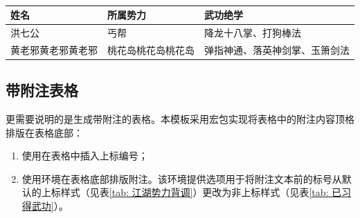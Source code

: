 \documentclass[doctor, vlined, ]{DissertUESTC}
\begin{document}
	\begin{table}[!ht]
		\caption{} \label{tab: 单元格三种垂直对齐方式}
		\begin{tabular}{p{2cm} b{2cm} m{2cm}}
			\toprule
			\textbf{姓名} & \textbf{所属势力} & \textbf{武功绝学} \\
			\midrule
			洪七公 & 丐帮 & 降龙十八掌、打狗棒法 \\
			黄老邪黄老邪黄老邪 & 桃花岛桃花岛桃花岛 & 弹指神通、落英神剑掌、玉箫剑法 \\
			\bottomrule
		\end{tabular}
	\end{table}
	
	\newpage
	\subsection{带附注表格}
	
	更需要说明的是生成带附注的表格。本模板采用宏包实现将表格中的附注内容顶格排版在表格底部：
	\begin{enumerate}
		\item 使用在表格中插入上标编号；
		\setcounter{enumi}{98}%
		\item 使用环境在表格底部排版附注。该环境提供选项用于将附注文本前的标号从默认的上标样式（见表\ref{tab: 江湖势力背调}）更改为非上标样式（见表\ref{tab: 已习得武功}）。
	\end{enumerate}
	
\end{document}
